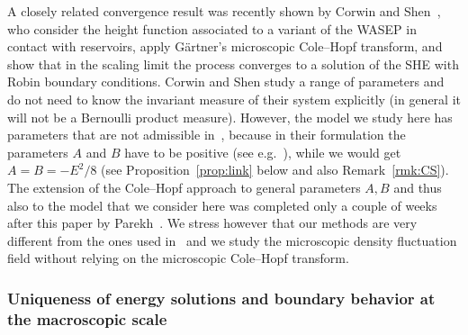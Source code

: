 \documentclass[AHL,Unicode,longabstracts]{cedram}
\begin{document}
A closely related convergence result was recently shown by Corwin and Shen~\cite{Corwin2016}, who consider the height function associated to a variant of the WASEP in contact with reservoirs, apply G\"artner's microscopic Cole--Hopf transform, and show that in the scaling limit the process converges to a solution of the SHE with Robin boundary conditions. Corwin and Shen study a range of parameters and do not need to know the invariant measure of their system explicitly (in general it will not be a Bernoulli product measure). However, the model we study here has parameters that are not admissible in~\cite{Corwin2016}, because in their formulation the parameters $A$ and $B$ have to be positive (see e.g.~\cite[Proposition~2.7 and p.~14]{Corwin2016}), while we would get $A = B = -E^2/8$ (see Proposition~\ref{prop:link} below and also Remark~\ref{rmk:CS}). The extension of the Cole--Hopf approach to general parameters $A,B$ and thus also to the model that we consider here was completed only a couple of weeks after this paper by Parekh~\cite{Parekh2017}. We stress however that our methods are very different from the ones used in~\cite{Corwin2016, Parekh2017} and we study the microscopic density fluctuation field without relying on the microscopic Cole--Hopf transform.


\subsubsection{Uniqueness of energy solutions and boundary behavior at the macroscopic scale}
\end{document}
